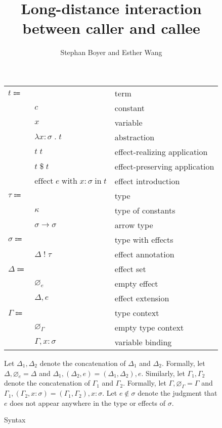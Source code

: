 \documentclass[12pt]{article}
\title{Long-distance interaction \\ between caller and callee}
\author{Stephan Boyer and Esther Wang}
\date{}
\newcommand\parens[1]{\left( #1 \right)} %
\newcommand\eterm{t}
\newcommand\econst{c}
\newcommand\evar{x}
\newcommand\eabs[2]{\lambda #1 \; . \; #2} %
\newcommand\eapp[2]{#1 \; #2}
\newcommand\eappx[2]{#1 \; \$ \; #2}
\newcommand\eeffect[4]{\text{effect} \; #1 \; \text{with} \; \tanno{#2}{#3} \; \text{in} \; #4}
\newcommand\ttype{\tau}
\newcommand\tconst{\kappa}
\newcommand\tarrow[2]{#1 \rightarrow #2} %
\newcommand\tanno[2]{#1 : #2} %
\newcommand\tx{\sigma}
\newcommand\twithx[2]{#1 \; ! \; #2} %
\newcommand\xeffect{e}
\newcommand\xeffects{\Delta}
\newcommand\xempty{\varnothing_{\xeffect}}
\newcommand\xextend[2]{#1, #2}
\newcommand\xunion[2]{#1, #2}
\newcommand\xnotint[2]{#1 \notin #2} %
\newcommand\ccontext{\Gamma}
\newcommand\cempty{\varnothing_{\ccontext}}
\newcommand\cextend[2]{#1, #2}
\newcommand\cunion[2]{#1, #2}
\begin{document}
  \maketitle

  \begin{figure}
    \begin{mdframed}
      \begin{center}
        \begin{tabular}{l l l}
          $\eterm \Coloneqq $ & & term \\
          & $\econst$ & constant \\
          & $\evar$ & variable \\
          & $\eabs{\tanno{\evar}{\tx}}{\eterm}$ & abstraction \\
          & $\eapp{\eterm}{\eterm}$ & effect-realizing application \\
          & $\eappx{\eterm}{\eterm}$ & effect-preserving application \\
          & $\eeffect{\xeffect}{\evar}{\tx}{\eterm}$ & effect introduction \\
          $\ttype \Coloneqq$ & & type \\
          & $\tconst$ & type of constants \\
          & $\tarrow{\tx}{\tx}$ & arrow type \\
          $\tx \Coloneqq$ & & type with effects \\
          & $\twithx{\xeffects}{\ttype}$ & effect annotation \\
          $\xeffects \Coloneqq$ & & effect set \\
          & $\xempty$ & empty effect \\
          & $\xextend{\xeffects}{\xeffect}$ & effect extension \\
          $\ccontext \Coloneqq$ & & type context \\
          & $\cempty$ & empty type context \\
          & $\cextend{\ccontext}{\tanno{\evar}{\tx}}$ & variable binding \\
        \end{tabular}
      \end{center}

      \bigskip

      Let $\xunion{\xeffects_1}{\xeffects_2}$ denote the concatenation of $\xeffects_1$ and $\xeffects_2$. Formally, let $\xunion{\xeffects}{\xempty} = \xeffects$ and $\xunion{\xeffects_1}{\parens{\xextend{\xeffects_2}{\xeffect}}} = \xextend{\parens{\xunion{\xeffects_1}{\xeffects_2}}}{\xeffect}$. Similarly, let $\cunion{\ccontext_1}{\ccontext_2}$ denote the concatenation of $\ccontext_1$ and $\ccontext_2$. Formally, let $\cunion{\ccontext}{\cempty} = \ccontext$ and $\cunion{\ccontext_1}{\parens{\cextend{\ccontext_2}{\tanno{\evar}{\tx}}}} = \cextend{\parens{\cunion{\ccontext_1}{\ccontext_2}}}{\tanno{\evar}{\tx}}$. Let $\xnotint{\xeffect}{\tx}$ denote the judgment that $\xeffect$ does not appear anywhere in the type or effects of $\tx$.

      \caption{Syntax}\label{fig:syntax}
    \end{mdframed}
  \end{figure}
\end{document}
